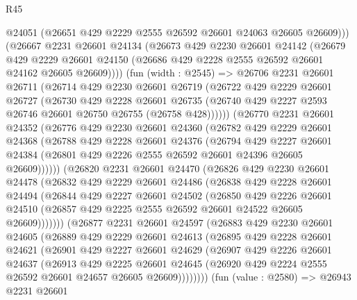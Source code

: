\begin{lexlean}{R45}
\begin{coremodule}
        @24051
        (@26651 @429 @2229 @2555 @26592 @26601 @24063 @26605 @26609)))
    (@26667
      @2231
      @26601
      @24134
      (@26673
        @429
        @2230
        @26601
        @24142
        (@26679
          @429
          @2229
          @26601
          @24150
          (@26686 @429 @2228 @2555 @26592 @26601 @24162 @26605 @26609))))
    (fun (width : @2545) =>
    @26706
      @2231
      @26601
      @26711
      (@26714
        @429
        @2230
        @26601
        @26719
        (@26722
          @429
          @2229
          @26601
          @26727
          (@26730
            @429
            @2228
            @26601
            @26735
            (@26740 @429 @2227 @2593 @26746 @26601 @26750 @26755 (@26758 @428))))))
    (@26770
      @2231
      @26601
      @24352
      (@26776
        @429
        @2230
        @26601
        @24360
        (@26782
          @429
          @2229
          @26601
          @24368
          (@26788
            @429
            @2228
            @26601
            @24376
            (@26794
              @429
              @2227
              @26601
              @24384
              (@26801 @429 @2226 @2555 @26592 @26601 @24396 @26605 @26609))))))
    (@26820
      @2231
      @26601
      @24470
      (@26826
        @429
        @2230
        @26601
        @24478
        (@26832
          @429
          @2229
          @26601
          @24486
          (@26838
            @429
            @2228
            @26601
            @24494
            (@26844
              @429
              @2227
              @26601
              @24502
              (@26850
                @429
                @2226
                @26601
                @24510
                (@26857 @429 @2225 @2555 @26592 @26601 @24522 @26605 @26609)))))))
    (@26877
      @2231
      @26601
      @24597
      (@26883
        @429
        @2230
        @26601
        @24605
        (@26889
          @429
          @2229
          @26601
          @24613
          (@26895
            @429
            @2228
            @26601
            @24621
            (@26901
              @429
              @2227
              @26601
              @24629
              (@26907
                @429
                @2226
                @26601
                @24637
                (@26913
                  @429
                  @2225
                  @26601
                  @24645
                  (@26920 @429 @2224 @2555 @26592 @26601 @24657 @26605 @26609))))))))
    (fun (value : @2580) =>
    @26943
      @2231
      @26601

\end{coremodule}
\end{lexlean}
